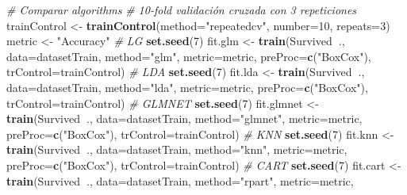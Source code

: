 \documentclass[]{article}
\newenvironment{Shaded}{\begin{snugshade}}{\end{snugshade}}
\newcommand{\KeywordTok}[1]{\textcolor[rgb]{0.13,0.29,0.53}{\textbf{#1}}}
\newcommand{\DataTypeTok}[1]{\textcolor[rgb]{0.13,0.29,0.53}{#1}}
\newcommand{\DecValTok}[1]{\textcolor[rgb]{0.00,0.00,0.81}{#1}}
\newcommand{\StringTok}[1]{\textcolor[rgb]{0.31,0.60,0.02}{#1}}
\newcommand{\CommentTok}[1]{\textcolor[rgb]{0.56,0.35,0.01}{\textit{#1}}}
\newcommand{\OperatorTok}[1]{\textcolor[rgb]{0.81,0.36,0.00}{\textbf{#1}}}
\newcommand{\NormalTok}[1]{#1}
\begin{document}
\begin{Shaded}
\begin{Highlighting}[]
\CommentTok{# Comparar algorithms}
\CommentTok{# 10-fold validación cruzada con 3 repeticiones}
\NormalTok{trainControl <-}\StringTok{ }\KeywordTok{trainControl}\NormalTok{(}\DataTypeTok{method=}\StringTok{"repeatedcv"}\NormalTok{, }\DataTypeTok{number=}\DecValTok{10}\NormalTok{, }\DataTypeTok{repeats=}\DecValTok{3}\NormalTok{)}
\NormalTok{metric <-}\StringTok{ "Accuracy"}
\CommentTok{# LG}
\KeywordTok{set.seed}\NormalTok{(}\DecValTok{7}\NormalTok{)}
\NormalTok{fit.glm <-}\StringTok{ }\KeywordTok{train}\NormalTok{(Survived}\OperatorTok{~}\NormalTok{., }\DataTypeTok{data=}\NormalTok{datasetTrain, }\DataTypeTok{method=}\StringTok{"glm"}\NormalTok{, }\DataTypeTok{metric=}\NormalTok{metric, }\DataTypeTok{preProc=}\KeywordTok{c}\NormalTok{(}\StringTok{"BoxCox"}\NormalTok{),}
    \DataTypeTok{trControl=}\NormalTok{trainControl)}
\CommentTok{# LDA}
\KeywordTok{set.seed}\NormalTok{(}\DecValTok{7}\NormalTok{)}
\NormalTok{fit.lda <-}\StringTok{ }\KeywordTok{train}\NormalTok{(Survived}\OperatorTok{~}\NormalTok{., }\DataTypeTok{data=}\NormalTok{datasetTrain, }\DataTypeTok{method=}\StringTok{"lda"}\NormalTok{, }\DataTypeTok{metric=}\NormalTok{metric, }\DataTypeTok{preProc=}\KeywordTok{c}\NormalTok{(}\StringTok{"BoxCox"}\NormalTok{),}
    \DataTypeTok{trControl=}\NormalTok{trainControl)}
\CommentTok{# GLMNET}
\KeywordTok{set.seed}\NormalTok{(}\DecValTok{7}\NormalTok{)}
\NormalTok{fit.glmnet <-}\StringTok{ }\KeywordTok{train}\NormalTok{(Survived}\OperatorTok{~}\NormalTok{., }\DataTypeTok{data=}\NormalTok{datasetTrain, }\DataTypeTok{method=}\StringTok{"glmnet"}\NormalTok{, }\DataTypeTok{metric=}\NormalTok{metric,}
    \DataTypeTok{preProc=}\KeywordTok{c}\NormalTok{(}\StringTok{"BoxCox"}\NormalTok{), }\DataTypeTok{trControl=}\NormalTok{trainControl)}
\CommentTok{# KNN}
\KeywordTok{set.seed}\NormalTok{(}\DecValTok{7}\NormalTok{)}
\NormalTok{fit.knn <-}\StringTok{ }\KeywordTok{train}\NormalTok{(Survived}\OperatorTok{~}\NormalTok{., }\DataTypeTok{data=}\NormalTok{datasetTrain, }\DataTypeTok{method=}\StringTok{"knn"}\NormalTok{, }\DataTypeTok{metric=}\NormalTok{metric, }\DataTypeTok{preProc=}\KeywordTok{c}\NormalTok{(}\StringTok{"BoxCox"}\NormalTok{),}
    \DataTypeTok{trControl=}\NormalTok{trainControl)}
\CommentTok{# CART}
\KeywordTok{set.seed}\NormalTok{(}\DecValTok{7}\NormalTok{)}
\NormalTok{fit.cart <-}\StringTok{ }\KeywordTok{train}\NormalTok{(Survived}\OperatorTok{~}\NormalTok{., }\DataTypeTok{data=}\NormalTok{datasetTrain, }\DataTypeTok{method=}\StringTok{"rpart"}\NormalTok{, }\DataTypeTok{metric=}\NormalTok{metric,}

\end{Highlighting}
\end{Shaded}
\end{document}
